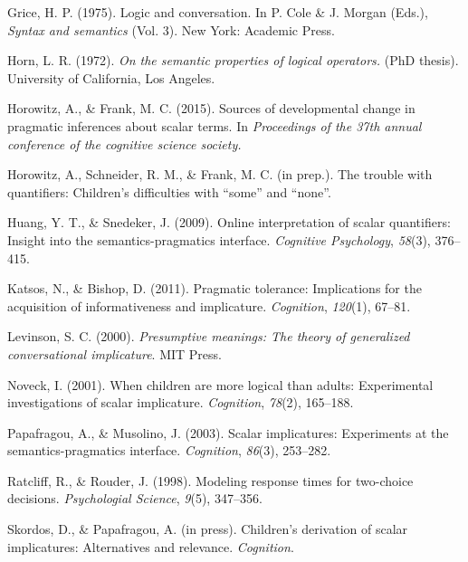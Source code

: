 \documentclass[10pt, letterpaper]{article}
\begin{document}
Grice, H. P. (1975). Logic and conversation. In P. Cole \& J. Morgan
(Eds.), \emph{Syntax and semantics} (Vol. 3). New York: Academic Press.

Horn, L. R. (1972). \emph{On the semantic properties of logical
operators.} (PhD thesis). University of California, Los Angeles.

Horowitz, A., \& Frank, M. C. (2015). Sources of developmental change in
pragmatic inferences about scalar terms. In \emph{Proceedings of the
37th annual conference of the cognitive science society.}

Horowitz, A., Schneider, R. M., \& Frank, M. C. (in prep.). The trouble
with quantifiers: Children's difficulties with ``some'' and ``none''.

Huang, Y. T., \& Snedeker, J. (2009). Online interpretation of scalar
quantifiers: Insight into the semantics-pragmatics interface.
\emph{Cognitive Psychology}, \emph{58}(3), 376--415.

Katsos, N., \& Bishop, D. (2011). Pragmatic tolerance: Implications for
the acquisition of informativeness and implicature. \emph{Cognition},
\emph{120}(1), 67--81.

Levinson, S. C. (2000). \emph{Presumptive meanings: The theory of
generalized conversational implicature}. MIT Press.

Noveck, I. (2001). When children are more logical than adults:
Experimental investigations of scalar implicature. \emph{Cognition},
\emph{78}(2), 165--188.

Papafragou, A., \& Musolino, J. (2003). Scalar implicatures: Experiments
at the semantics-pragmatics interface. \emph{Cognition}, \emph{86}(3),
253--282.

Ratcliff, R., \& Rouder, J. (1998). Modeling response times for
two-choice decisions. \emph{Psychologial Science}, \emph{9}(5),
347--356.

Skordos, D., \& Papafragou, A. (in press). Children's derivation of
scalar implicatures: Alternatives and relevance. \emph{Cognition}.
\end{document}
